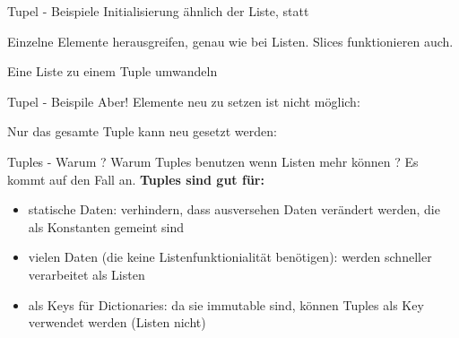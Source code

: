 \begin{frame}{Tupel - Beispiele}
	Initialisierung ähnlich der Liste, \codeline{()} statt \codeline{[]}
	
	
	Einzelne Elemente herausgreifen, genau wie bei Listen. Slices funktionieren auch.
	
	
	Eine Liste zu einem Tuple umwandeln
	
\end{frame}
\begin{frame}{Tupel - Beispile}
	Aber! Elemente neu zu setzen ist nicht möglich:
	
	
	Nur das gesamte Tuple kann neu gesetzt werden:
	
\end{frame}

\begin{frame}{Tuples - Warum ?}
	Warum Tuples benutzen wenn Listen mehr können ? Es kommt auf den Fall an.
	\linebreak\linebreak
	\textbf{Tuples sind gut für:}
	\begin{itemize}
		
		\item statische Daten: verhindern, dass ausversehen Daten verändert werden, die als Konstanten gemeint sind
		
		\item vielen Daten (die keine Listenfunktionialität benötigen): werden schneller verarbeitet als Listen
		
		\item als Keys für Dictionaries: da sie immutable sind, können Tuples als Key verwendet werden (Listen nicht)
	\end{itemize}
\end{frame}	

